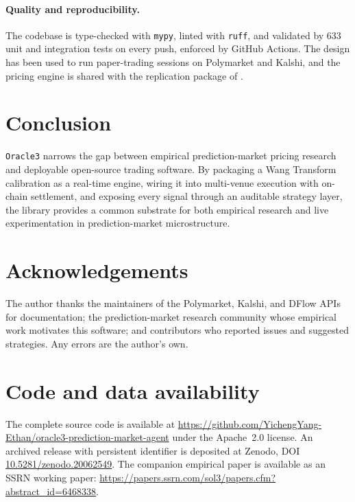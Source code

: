 \documentclass[11pt,a4paper]{article}
\begin{document}
\paragraph{Quality and reproducibility.}
The codebase is type-checked with \texttt{mypy}, linted with \texttt{ruff},
and validated by 633 unit and integration tests on every push, enforced by
GitHub Actions. The design has been used to run paper-trading sessions on
Polymarket and Kalshi, and the pricing engine is shared with the replication
package of \citet{yang:2026}.

\section{Conclusion}
\label{sec:conclusion}

\texttt{Oracle3} narrows the gap between empirical prediction-market pricing
research and deployable open-source trading software. By packaging a
Wang Transform calibration \citep{wang:2000,yang:2026} as a real-time engine,
wiring it into multi-venue execution with on-chain settlement, and exposing
every signal through an auditable strategy layer, the library provides a
common substrate for both empirical research and live experimentation in
prediction-market microstructure.

\section*{Acknowledgements}

The author thanks the maintainers of the Polymarket, Kalshi, and DFlow APIs
for documentation; the prediction-market research community whose empirical
work motivates this software; and contributors who reported issues and
suggested strategies. Any errors are the author's own.

\section*{Code and data availability}

The complete source code is available at
\url{https://github.com/YichengYang-Ethan/oracle3-prediction-market-agent} under the Apache~2.0
license. An archived release with persistent identifier is deposited at
Zenodo, DOI \href{https://doi.org/10.5281/zenodo.20062549}{10.5281/zenodo.20062549}.
The companion empirical paper is available as an SSRN working paper:
\url{https://papers.ssrn.com/sol3/papers.cfm?abstract_id=6468338}.


\end{document}
